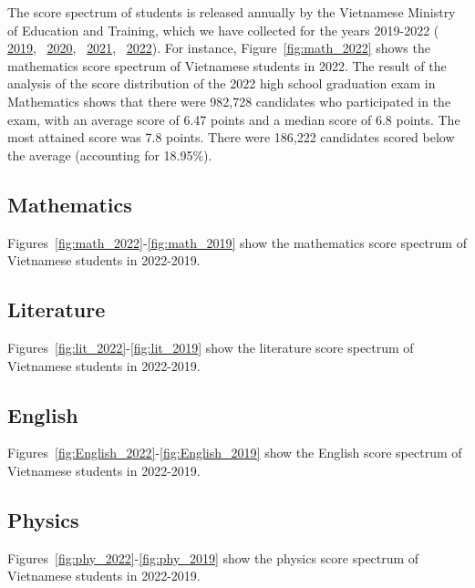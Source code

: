 \documentclass{article}
\begin{document}
{	The score spectrum of students is released annually by the Vietnamese Ministry of Education and Training, which we have collected for the years 2019-2022 (
	\href{https://moet.gov.vn/tintuc/Pages/tin-tong-hop.aspx?ItemID=6111}{2019},~
	\href{https://moet.gov.vn/tintuc/Pages/tin-tong-hop.aspx?ItemID=6879}{2020},~
	\href{https://moet.gov.vn/tintuc/Pages/tin-tong-hop.aspx?ItemID=7451}{2021},~
	\href{https://vietnamnet.vn/pho-diem-cac-mon-thi-tot-nghiep-thpt-2022-2042421.html}{2022}). For instance, Figure~\ref{fig:math_2022} shows the mathematics score spectrum of Vietnamese students in 2022. The result of the analysis of the score distribution of the 2022 high school graduation exam in Mathematics shows that there were 982,728 candidates who participated in the exam, with an average score of 6.47 points and a median score of 6.8 points. The most attained score was 7.8 points. There were 186,222 candidates scored below the average (accounting for 18.95\%).
	
	\subsection{Mathematics} 
	\label{sec:Score Spectrum_Math}
	Figures~\ref{fig:math_2022}-\ref{fig:math_2019} show the mathematics score spectrum of Vietnamese students in 2022-2019.
	
	\subsection{Literature}
	\label{sec:Score Spectrum_Lit}
	
	Figures~\ref{fig:lit_2022}-\ref{fig:lit_2019} show the literature score spectrum of Vietnamese students in 2022-2019.
	 
	\subsection{English}
	\label{sec:Score Spectrum_Eng}
	
	Figures~\ref{fig:English_2022}-\ref{fig:English_2019} show the English score spectrum of Vietnamese students in 2022-2019.

	\subsection{Physics}
	\label{sec:Score Spectrum_Phy}
	
	Figures~\ref{fig:phy_2022}-\ref{fig:phy_2019} show the physics score spectrum of Vietnamese students in 2022-2019.
	
}
\end{document}

